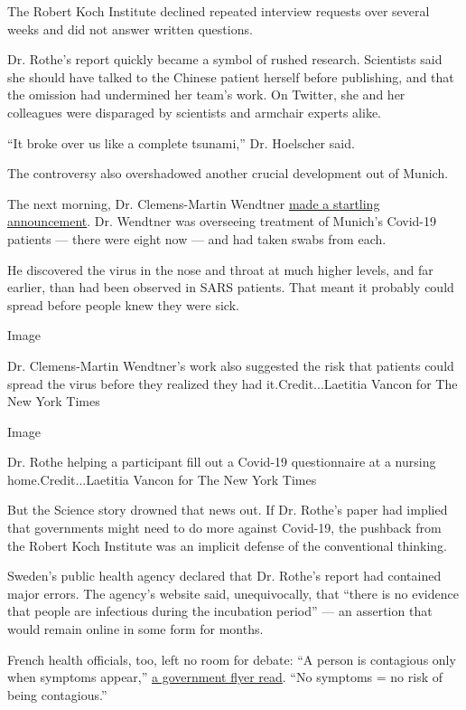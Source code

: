 The Robert Koch Institute declined repeated interview requests over
several weeks and did not answer written questions.

Dr. Rothe's report quickly became a symbol of rushed research.
Scientists said she should have talked to the Chinese patient herself
before publishing, and that the omission had undermined her team's work.
On Twitter, she and her colleagues were disparaged by scientists and
armchair experts alike.

``It broke over us like a complete tsunami,'' Dr. Hoelscher said.

The controversy also overshadowed another crucial development out of
Munich.

The next morning, Dr. Clemens-Martin Wendtner
\href{https://instmikrobiobw.de/aktuelles/ansicht/pressemitteilung}{made
a startling announcement}. Dr. Wendtner was overseeing treatment of
Munich's Covid-19 patients --- there were eight now --- and had taken
swabs from each.

He discovered the virus in the nose and throat at much higher levels,
and far earlier, than had been observed in SARS patients. That meant it
probably could spread before people knew they were sick.

Image

Dr. Clemens-Martin Wendtner's work also suggested the risk that patients
could spread the virus before they realized they had
it.Credit...Laetitia Vancon for The New York Times

Image

Dr. Rothe helping a participant fill out a Covid-19 questionnaire at a
nursing home.Credit...Laetitia Vancon for The New York Times

But the Science story drowned that news out. If Dr. Rothe's paper had
implied that governments might need to do more against Covid-19, the
pushback from the Robert Koch Institute was an implicit defense of the
conventional thinking.

Sweden's public health agency declared that Dr. Rothe's report had
contained major errors. The agency's website said, unequivocally, that
``there is no evidence that people are infectious during the incubation
period'' --- an assertion that would remain online in some form for
months.

French health officials, too, left no room for debate: ``A person is
contagious only when symptoms appear,''
\href{https://www.lemonde.fr/les-decodeurs/article/2020/02/06/coronavirus-une-affiche-du-ministere-ecarte-trop-vite-le-risque-de-contagion-lors-de-l-incubation_6028658_4355770.html}{a
government flyer read}. ``No symptoms = no risk of being contagious.''

